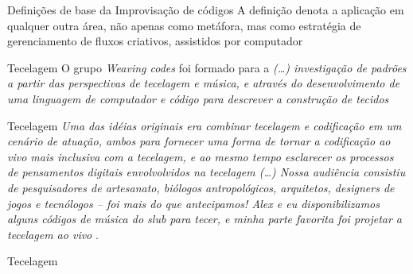 \documentclass[aspectratio=169]{beamer}
\begin{document}
\begin{frame}{Definições de base da Improvisação de códigos}
A definição denota a aplicação em qualquer outra área, não apenas como metáfora, mas como estratégia de gerenciamento de fluxos criativos, assistidos por computador
\end{frame}

\begin{frame}{Tecelagem}
O grupo \emph{Weaving codes} foi formado para  a \emph{(\ldots) investigação de padrões a partir das perspectivas de tecelagem e música, e através do desenvolvimento de uma linguagem de computador e código para descrever a construção de tecidos} \cite{griffths_weave_2015}
\end{frame}

\begin{frame}{Tecelagem}
\emph{Uma das idéias originais era combinar tecelagem e codificação em um cenário de atuação, ambos para fornecer uma forma de tornar a codificação ao vivo mais inclusiva com a tecelagem, e ao mesmo tempo esclarecer os processos de pensamentos digitais envolvolvidos na tecelagem (\ldots) Nossa audiência consistiu de pesquisadores de artesanato, biólogos antropológicos, arquitetos, designers de jogos e tecnólogos -- foi mais do que antecipamos! Alex e eu disponibilizamos alguns códigos de música do \emph{slub} para tecer, e minha parte favorita foi projetar a tecelagem ao vivo} \cite{griffths_weave_2015}.
\end{frame}


\begin{frame}{Tecelagem}
\tecelagem
\end{frame}
\end{document}
